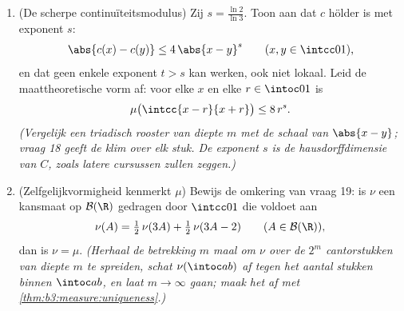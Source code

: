 \begin{problem}
\begin{enumerate}[resume]
        singulier ten opzichte van $\lambda$. Leg in een korte
        alinea uit hoe dat twee gezichten van één verschijnsel
        zijn, en formuleer de algemene moraal: niet-dalende
        functies corresponderen met  ($F \leftrightarrow
        \mu_F$), differentieerbaarheid bijna overal correspondeert
        met het ``absoluut  deel'', en $c$ is de
        standaardgetuige dat een  $F$ helemaal \emph{geen}
        absoluut  deel hoeft te dragen.
  \item (De scherpe continuïteitsmodulus) Zij $s = \frac{\ln
        2}{\ln 3}$. Toon aan dat $c$ hölder  is met
        exponent $s$:
        \[
        \abs{c(x) - c(y)} \leq 4\,\abs{x - y}^{s}
        \qquad (x, y \in \intcc01),
        \]
        en dat geen enkele exponent $t > s$ kan werken, ook niet
        lokaal. Leid de maattheoretische vorm af: voor elke $x$ en
        elke $r \in \intoc01$ is
        \[
        \mu\bigl(\intcc{x - r}{x + r}\bigr) \leq 8\,r^{s} .
        \]
        \emph{(Vergelijk een triadisch rooster van diepte $m$ met
        de schaal van $\abs{x - y}$; vraag 18 geeft de klim over
        elk stuk. De exponent $s$ is de hausdorffdimensie van $C$,
        zoals latere cursussen zullen zeggen.)}
  \item (Zelfgelijkvormigheid kenmerkt $\mu$) Bewijs de omkering
        van vraag 19: is $\nu$ een kansmaat op $\mathcal B(\R)$
        gedragen door $\intcc01$ die voldoet aan
        \[
        \nu(A) = \tfrac12\,\nu(3A) + \tfrac12\,\nu(3A - 2)
        \qquad (A \in \mathcal B(\R)),
        \]
        dan is $\nu = \mu$. \emph{(Herhaal de betrekking $m$ maal
        om $\nu$ over de $2^m$ cantorstukken van diepte $m$ te
        spreiden, schat $\nu(\intoc ab)$ af tegen het aantal
        stukken binnen $\intoc ab$, en laat $m \to \infty$ gaan;
        maak het af met \cref{thm:b3:measure:uniqueness}.)}
\end{enumerate}
\end{problem}
